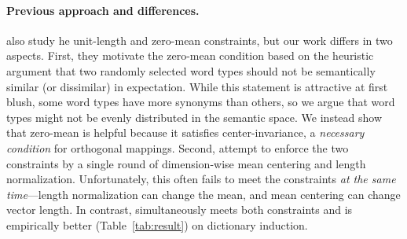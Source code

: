 \paragraph{Previous approach and differences.}
\citet{artetxe-16} also study he unit-length and zero-mean
constraints, but our work differs in two aspects.
First, they motivate the zero-mean condition based on the heuristic argument
that two randomly selected word types should not be semantically similar (or
dissimilar) in expectation.
While this statement is attractive at first blush, some word types have more
synonyms than others, so we argue that word types might not be evenly
distributed in the semantic space.
We instead show that zero-mean is helpful because it satisfies
center-invariance, a \textit{necessary condition} for orthogonal mappings.
Second, \citet{artetxe-16} attempt to enforce the two constraints by a single
round of dimension-wise mean centering and length normalization.
%
Unfortunately,
this often fails to meet the constraints \textit{at the same time}---length
normalization can change the mean, and mean centering can change
vector length.
%
In contrast, \name{} simultaneously meets both constraints and is
empirically better (Table~\ref{tab:result}) on dictionary induction.
